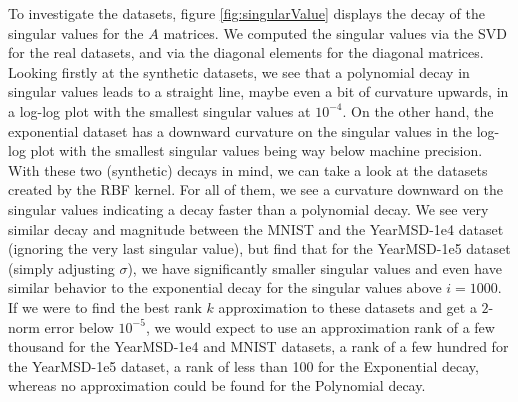 \documentclass{article}
\theoremstyle{definition}
\begin{document}
To investigate the datasets, figure \ref{fig:singularValue} displays the decay of the singular values for the $A$ matrices. We computed the singular values via the SVD for the real datasets, and via the diagonal elements for the diagonal matrices. Looking firstly at the synthetic datasets, we see that a polynomial decay in singular values leads to a straight line, maybe even a bit of curvature upwards, in a log-log plot with the smallest singular values at $10^{-4}$. On the other hand, the exponential dataset has a downward curvature on the singular values in the log-log plot with the smallest singular values being way below machine precision. With these two (synthetic) decays in mind, we can take a look at the datasets created by the RBF kernel. For all of them, we see a curvature downward on the singular values indicating a decay faster than a polynomial decay. We see very similar decay and magnitude between the MNIST and the YearMSD-1e4 dataset (ignoring the very last singular value), but find that for the YearMSD-1e5 dataset (simply adjusting $\sigma$), we have significantly smaller singular values and even have similar behavior to the exponential decay for the singular values above $i=1000$. If we were to find the best rank $k$ approximation to these datasets and get a $2$-norm error below $10^{-5}$, we would expect to use an approximation rank of a few thousand for the YearMSD-1e4 and MNIST datasets, a rank of a few hundred for the YearMSD-1e5 dataset, a rank of less than 100 for the Exponential decay, whereas no approximation could be found for the Polynomial decay.
\end{document}
